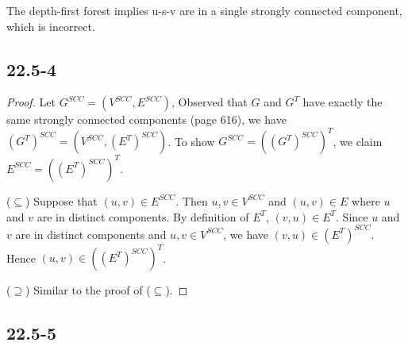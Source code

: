 
The depth-first forest implies u-s-v are in a single strongly connected component,
which is incorrect.

\subsection*{22.5-4}

\begin{proof}
    Let $G^{SCC} = (V^{SCC}, E^{SCC})$,
    Observed that $G$ and $G^T$ have exactly the same strongly connected components
    (page 616),
    we have $(G^T)^{SCC} = (V^{SCC}, (E^T)^{SCC})$.
    To show $G^{SCC} = ((G^T)^{SCC})^T$,
    we claim $E^{SCC} = ((E^T)^{SCC})^T$.

    ($\subseteq$)
    Suppose that $(u,v) \in E^{SCC}$.
    Then $u,v \in V^{SCC}$
    and $(u,v) \in E$ where $u$ and $v$ are in distinct components.
    By definition of $E^T$, $(v,u) \in E^T$.
    Since $u$ and $v$ are in distinct components
    and $u,v \in V^{SCC}$,
    we have $(v,u) \in (E^T)^{SCC}$.
    Hence $(u,v) \in ((E^T)^{SCC})^T$.

    ($\supseteq$)
    Similar to the proof of ($\subseteq$).
\end{proof}

\subsection*{22.5-5}

